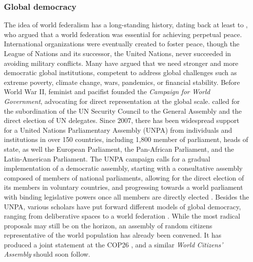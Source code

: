 \subsubsection{Global democracy}\label{subsubsec:literature_democracy}

The idea of world federalism has a long-standing history, dating back at least to \citet{kant_zum_1795}, who argued that a world federation was essential for achieving perpetual peace. 
International organizations were eventually created to foster peace, though the League of Nations and its successor, the United Nations, never succeeded in avoiding military conflicts. 
Many have argued that we need stronger and more democratic global institutions, competent to address global challenges such as extreme poverty, climate change, wars, pandemics, or financial stability. 
Before World War II, feminist and pacifist \citet{maverick_lloyd_chaos_1937} founded the \textit{Campaign for World Government}, advocating for direct representation at the global scale. 
\citet{einstein_general_1947} called for the subordination of the UN Security Council to the General Assembly and the direct election of UN delegates. 
Since 2007, there has been widespread support for a United Nations Parliamentary Assembly (UNPA) from individuals and institutions in over 150 countries, including 1,800 member of parliament, heads of state, as well the European Parliament, the Pan-African Parliament, and the Latin-American Parliament. The UNPA campaign calls for a gradual implementation of a democratic assembly, starting with a consultative assembly composed of members of national parliaments, allowing for the direct election of its members in voluntary countries, and progressing towards a world parliament with binding legislative powers once all members are directly elected \citep{leinen_world_2018}. %
Besides the UNPA, various scholars have put forward different models of global democracy, ranging from deliberative spaces to a world federation \citep{archibugi_global_2011}. %
While the most radical proposals may still be on the horizon, an assembly of random citizens representative of the world population has already been convened. It has produced a joint statement at the COP26 \citep{global_assembly_report_2022}, and a similar \textit{World Citizens' Assembly} should soon follow. 

